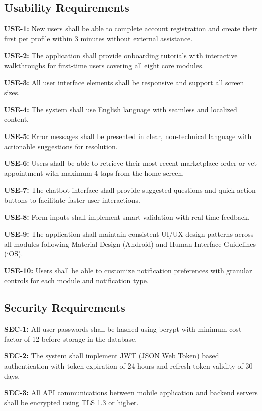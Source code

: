 \subsection{Usability Requirements}

\textbf{USE-1:} New users shall be able to complete account registration and create their first pet profile within 3 minutes without external assistance.

\textbf{USE-2:} The application shall provide onboarding tutorials with interactive walkthroughs for first-time users covering all eight core modules.

\textbf{USE-3:} All user interface elements shall be responsive and support all screen sizes.

\textbf{USE-4:} The system shall use English language with seamless and localized content.

\textbf{USE-5:} Error messages shall be presented in clear, non-technical language with actionable suggestions for resolution.

\textbf{USE-6:} Users shall be able to retrieve their most recent marketplace order or vet appointment with maximum 4 taps from the home screen.

\textbf{USE-7:} The chatbot interface shall provide suggested questions and quick-action buttons to facilitate faster user interactions.

\textbf{USE-8:} Form inputs shall implement smart validation with real-time feedback.

\textbf{USE-9:} The application shall maintain consistent UI/UX design patterns across all modules following Material Design (Android) and Human Interface Guidelines (iOS).

\textbf{USE-10:} Users shall be able to customize notification preferences with granular controls for each module and notification type.

\subsection{Security Requirements}

\textbf{SEC-1:} All user passwords shall be hashed using bcrypt with minimum cost factor of 12 before storage in the database.

\textbf{SEC-2:} The system shall implement JWT (JSON Web Token) based authentication with token expiration of 24 hours and refresh token validity of 30 days.

\textbf{SEC-3:} All API communications between mobile application and backend servers shall be encrypted using TLS 1.3 or higher.


